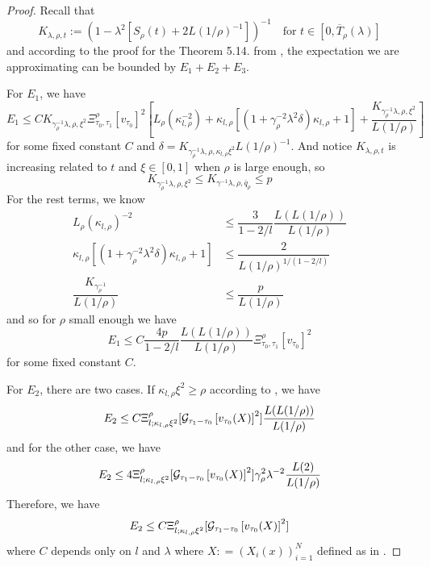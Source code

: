 \begin{proof}
    Recall that 
    \[
    K_{\lambda,\rho,t}:= (1-\lambda^2[S_{\rho}(t)+2L(1/\rho)^{-1}])^{-1}\quad\text{for }t\in[0,\overline{T}_{\rho}(\lambda)]
    \]
    and according to the proof for the Theorem 5.14. from \cite{dunlap2026renormalizationflow2dnonlinear}, the expectation we are approximating can be bounded by $E_1+E_2+E_3$.\par
    For $E_1$, we have
    \[
    E_1 \leq C K_{\gamma_{\rho}^{-1}\lambda,\rho,\xi^2}\Xi^{\rho}_{\tau_0,\tau_1}[v_{\tau_0}]^2\left[L_{\rho}(\kappa_{l,\rho}^{-2})+\kappa_{l,\rho}[(1+\gamma_{\rho}^{-2}\lambda^2\delta)\kappa_{l,\rho}+1]+\dfrac{K_{\gamma_{\rho}^{-1}\lambda,\rho,\xi^2}}{L(1/\rho)}\right]
    \]
    for some fixed constant $C$ and $\delta = K_{\gamma_{\rho}^{-1}\lambda,\rho,\kappa_{l,\rho}\xi^2}L(1/\rho)^{-1}$. And notice $K_{\lambda,\rho,t}$ is increasing related to $t$ and $\xi \in [0,1]$ when $\rho$ is large enough, so
    \[ K_{\gamma_{\rho}^{-1}\lambda,\rho,\xi^2} \leq K_{\gamma^{-1}\lambda,\rho,\overline{q}_{\rho}} \leq p
    \]
    For the rest terms, we know
    \[
    \begin{aligned}
        L_{\rho}(\kappa_{l,\rho})^{-2} &\leq \dfrac{3}{1-2/l}\dfrac{L(L(1/\rho))}{L(1/\rho)} \\
        \kappa_{l,\rho}[(1+\gamma_{\rho}^{-2}\lambda^2\delta)\kappa_{l,\rho}+1] & \leq \dfrac{2}{L(1/\rho)^{1/(1-2/l)}} \\
        \dfrac{K_{\gamma_{\rho}^{-1}}}{L(1/\rho)} &\leq \dfrac{p}{L(1/\rho)}
    \end{aligned}
    \]
    and so for $\rho$ small enough we have
    \[
    E_1 \leq C\dfrac{4p}{1-2/l}\dfrac{L(L(1/\rho))}{L(1/\rho)}\Xi^{\rho}_{\tau_0,\tau_1}[v_{\tau_0}]^2
    \]
    for some fixed constant $C$.\par
    For $E_2$, there are two cases. If $\kappa_{l,\rho}\xi^2 \geq \rho$ according to \cite{dunlap2026renormalizationflow2dnonlinear},
    we have
    \[
    E_2 \leq C\Xi_{l;\kappa_{l,\rho}\xi^2}^{\rho}[\mathcal{G}_{\tau_1-\tau_0}\left[{v_{\tau_0}(X)}\right]^2]\dfrac{L(L(1/\rho))}{L(1/\rho)}
    \]
    and for the other case, we have
    \[
    E_2 \leq 4\Xi_{l;\kappa_{l,\rho}\xi^2}^{\rho}[\mathcal{G}_{\tau_1-\tau_0}\left[{v_{\tau_0}(X)}\right]^2]\gamma_{\rho}^2\lambda^{-2}\dfrac{L(2)}{L(1/\rho)}
    \]
    Therefore, we have
    \[
    E_2 \leq C\Xi_{l;\kappa_{l,\rho}\xi^2}^{\rho}[\mathcal{G}_{\tau_1-\tau_0}\left[{v_{\tau_0}(X)}\right]^2]
    \]
    where $C$ depends only on $l$ and $\lambda$ where $X: = (X_i(x))^N_{i=1}$ defined as in \cite{dunlap2026renormalizationflow2dnonlinear}.\par

\end{proof}
